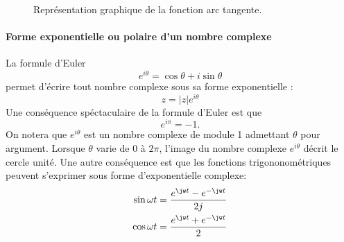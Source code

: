 \begin{figure}[!ht]
    \centering
{}
    \caption{Représentation graphique de la fonction arc tangente.\label{fig-arctangente}}
\end{figure}


\paragraph{Forme exponentielle ou polaire d'un nombre complexe}
La formule d'Euler 
$$
e^{i\theta}=\cos\theta+i\sin\theta
$$
permet d'écrire tout nombre complexe sous sa forme exponentielle : 
$$
z=|z|e^{i\theta}
$$
Une conséquence spéctaculaire de la formule d'Euler est que
$$
e^{i\pi}=-1.
$$
On notera que $e^{i\theta}$ est un nombre complexe de module 1 admettant $\theta$ pour argument.
Lorsque $\theta$ varie de $0$ à $2\pi$, l'image du nombre complexe $e^{i\theta}$ décrit 
le cercle unité.
Une autre conséquence est que les fonctions trigononométriques peuvent s'exprimer sous forme d'exponentielle 
complexe:
\begin{align*}
    \sin{\omega t}&=\dfrac{e^{\jw t}-e^{-\jw t}}{2j} \\
    \cos{\omega t}&=\dfrac{e^{\jw t}+e^{-\jw t}}{2}
\end{align*}

